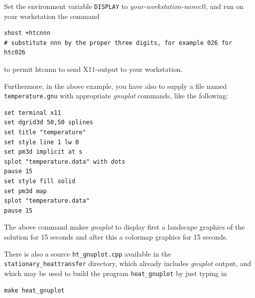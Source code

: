 \documentclass[11pt]{article}
\begin{document}
Set the environment variable {\tt DISPLAY} to {\it your-workstation-name}:0, and run on your workstation the command
\begin{scriptsize}
\begin{verbatim}
xhost +htcnnn 
# substitute nnn by the proper three digits, for example 026 for htc026
\end{verbatim}
\end{scriptsize}
\noindent to permit htcnnn to send X11-output to your workstation. 

\noindent Furthermore, in the above example, you have also to supply a file named {\tt temperature.gnu} with appropriate {\it gnuplot} commands, like the following:
\begin{scriptsize}
\begin{verbatim}
set terminal x11
set dgrid3d 50,50 splines
set title "temperature"
set style line 1 lw 0
set pm3d implicit at s
splot "temperature.data" with dots
pause 15
set style fill solid
set pm3d map
splot "temperature.data"
pause 15
\end{verbatim}
\end{scriptsize}

\noindent The above command makes {\it gnuplot} to display first a landscape graphics of the solution for 15 seconds and after this a colormap graphics for 15 seconds.

\noindent There is also a source {\tt ht\_gnuplot.cpp} available in the {\tt stationary\_heattransfer} directory, which already includes {\it gnuplot} output, and which may be used to build the program {\tt heat\_gnuplot} by just typing in
\begin{scriptsize}
\begin{verbatim}
make heat_gnuplot
\end{verbatim}
\end{scriptsize}
\end{document}
